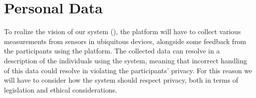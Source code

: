 
\section{Personal Data}
\label{sec:personal_data}

To realize the vision of our system (), the platform will have to collect various measurements from sensors in ubiquitous devices, alongside some feedback from the participants using the platform. The collected data can resolve in a description of the individuals using the system, meaning that incorrect handling of this data could resolve in violating the participants' privacy. For this reason we will have to consider how the system should respect privacy, both in terms of legislation and ethical considerations.



